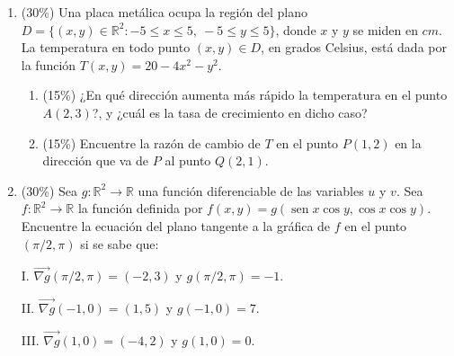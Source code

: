 \documentclass[11pt]{article}
\begin{document}
\begin{enumerate}
\newpage
\item{} (30\%) Una placa metálica ocupa la región del plano $D=\{(x,y)\in\mathbb{R}^2: -5\leq x\leq 5,\ -5\leq y\leq 5\}$, donde $x$ y $y$ se miden en $cm$. La temperatura en todo punto $(x,y)\in D$, en grados Celsius, está dada por la función $T(x,y)=20-4x^2-y^2$.
\begin{enumerate}
\item{} (15\%) ¿En qué dirección aumenta más rápido la temperatura en el punto $A(2,3)$?, y ¿cuál es la tasa de crecimiento en dicho caso?

\vspace{5cm}

\item{} (15\%) Encuentre la razón de cambio de $T$ en el punto $P(1,2)$ en la dirección que va de $P$ al punto $Q(2,1)$.

\vspace{5cm}
\end{enumerate}

\item{} (30\%) Sea $g:\mathbb{R}^2\to\mathbb{R}$ una función diferenciable de las variables $u$ y $v$. Sea $f:\mathbb{R}^2\to\mathbb{R}$ la función definida por $f(x,y)=g(\operatorname{sen}x\cos y,\cos x\cos y)$. Encuentre la ecuación del plano tangente a la gráfica de $f$ en el punto $(\pi/2,\pi)$ si se sabe que:

\vspace{4pt}
\noindent I. $\overrightarrow{\nabla g}(\pi/2,\pi)=(-2,3)$ y $g(\pi/2,\pi)=-1$.

\noindent II. $\overrightarrow{\nabla g}(-1,0)=(1,5)$ y $g(-1,0)=7$.

\noindent III. $\overrightarrow{\nabla g}(1,0)=(-4,2)$ y $g(1,0)=0$.

\vspace{6cm}
\end{enumerate}

\examfooter
\end{document}
